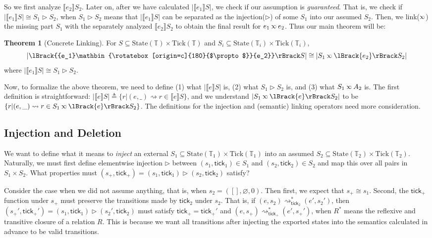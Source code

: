 \documentclass[acmsmall,review]{acmart}\settopmatter{printfolios=true,printccs=false,printacmref=false}
\theoremstyle{definition}
\newtheorem{thm}{Theorem}[section]
\newcommand*{\Time}{\mathbb{T}}
\newcommand*{\State}{\text{State}}
\newcommand*{\Tick}{\text{Tick}}
\newcommand*{\semlink}{\mathbin{\rotatebox[origin=c]{180}{$\propto$}}}
\newcommand*{\link}[2]{{#1}\semlink{#2}}
\newcommand*{\sembracket}[1]{\lBrack{#1}\rBrack}
\newcommand*{\tick}{\mathsf{tick}}
\begin{document}
So we first analyze $\sembracket{e_2}S_2$.
Later on, after we have calculated $|\sembracket{e_1}S|$, we check if our assumption is \emph{guaranteed}.
That is, we check if $|\sembracket{e_1}S|\cong S_1\rhd S_2$, when $S_1\rhd S_2$ means that $|\sembracket{e_1}S|$ can be {separated} as the {injection}($\rhd$) of some $S_1$ into our assumed $S_2$.
Then, we {link}($\semlink$) the missing part $S_1$ with the separately analyzed $\sembracket{e_2}S_2$ to obtain the final result for $\link{e_1}{e_2}$.
Thus our main theorem will be:
\begin{thm}[Concrete Linking] For $S\subseteq\State(\Time)\times\Tick(\Time)$ and $S_i\subseteq\State(\Time_i)\times\Tick(\Time_i)$,
  \[
    |\sembracket{\link{e_1}{e_2}}S|\cong|S_1\semlink\sembracket{e_2}S_2|
  \]
  where $|\sembracket{e_1}S|\cong S_1\rhd S_2$.
\end{thm}

Now, to formalize the above theorem, we need to define (1) what $|\sembracket{e}S|$ is, (2) what $S_1\rhd S_2$ is, and (3) what $S_1\semlink A_2$ is.
The first definition is straightforward: $|\sembracket{e}S|\triangleq\{r|(e,\_)\rightsquigarrow r\in\sembracket{e}S\}$, and we understand $|S_1\semlink\sembracket{e}S_2|$ to be $\{r|(e,\_)\rightsquigarrow r\in S_1\semlink\sembracket{e}S_2\}$.
The definitions for the injection and (semantic) linking operators need more consideration.

\subsection{Injection and Deletion}
We want to define what it means to \emph{inject} an external $S_1\subseteq\State(\Time_1)\times\Tick(\Time_1)$ into an assumed $S_2\subseteq\State(\Time_2)\times\Tick(\Time_2)$.
Naturally, we must first define elementwise injection $\rhd$ between $(s_1,\tick_1)\in S_1$ and $(s_2,\tick_2)\in S_2$ and map this over all pairs in $S_1\times S_2$.
What properties must $(s_+,\tick_+)=(s_1,\tick_1)\rhd(s_2,\tick_2)$ satisfy?

Consider the case when we did not assume anything, that is, when $s_2=([],\varnothing,0)$.
Then first, we expect that $s_+\cong s_1$.
Second, the $\tick_+$ function under $s_+$ must preserve the transitions made by $\tick_2$ under $s_2$.
That is, if $(e,s_2)\rightsquigarrow_{\tick_2}^*(e',s_2')$, then $(s_+',\tick_+')=(s_1,\tick_1)\rhd(s_2',\tick_2)$ must satisfy
$\tick_+=\tick_+'$ and $(e,s_+)\rightsquigarrow_{\tick_+}^*(e',s_+')$, when $R^*$ means the reflexive and transitive closure of a relation $R$.
This is because we want all transitions after injecting the exported states into the semantics calculated in advance to be valid transitions.
\end{document}
